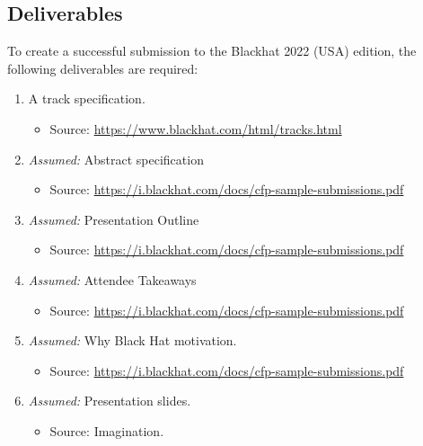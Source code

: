 \subsection{Deliverables}
To create a successful submission to the Blackhat 2022 (USA) edition, the following deliverables are required:
\begin{enumerate}
	\item A track specification.
	\begin{itemize}
		\item Source: \url{https://www.blackhat.com/html/tracks.html}
	\end{itemize}
	
	\item \textit{Assumed:} Abstract specification
	\begin{itemize}
		\item Source: \url{https://i.blackhat.com/docs/cfp-sample-submissions.pdf}
	\end{itemize}
	
	\item \textit{Assumed:} Presentation Outline
	\begin{itemize}
		\item Source: \url{https://i.blackhat.com/docs/cfp-sample-submissions.pdf}
	\end{itemize}

	\item \textit{Assumed:} Attendee Takeaways
	\begin{itemize}
		\item Source: \url{https://i.blackhat.com/docs/cfp-sample-submissions.pdf}
	\end{itemize}

	\item \textit{Assumed:} Why Black Hat motivation.
	\begin{itemize}
		\item Source: \url{https://i.blackhat.com/docs/cfp-sample-submissions.pdf}
	\end{itemize}
	
	\item \textit{Assumed:} Presentation slides.
	\begin{itemize}
		\item Source: Imagination.
	\end{itemize}
\end{enumerate}


